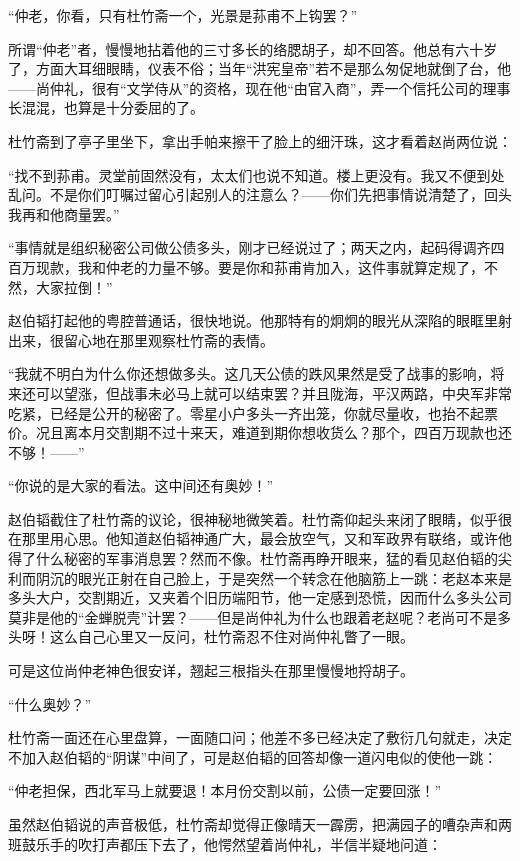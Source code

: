 \par “仲老，你看，只有杜竹斋一个，光景是荪甫不上钩罢？”
\par 所谓“仲老”者，慢慢地拈着他的三寸多长的络腮胡子，却不回答。他总有六十岁了，方面大耳细眼睛，仪表不俗；当年“洪宪皇帝”若不是那么匆促地就倒了台，他——尚仲礼，很有“文学侍从”的资格，现在他“由官入商”，弄一个信托公司的理事长混混，也算是十分委屈的了。
\par 杜竹斋到了亭子里坐下，拿出手帕来擦干了脸上的细汗珠，这才看着赵尚两位说：
\par “找不到荪甫。灵堂前固然没有，太太们也说不知道。楼上更没有。我又不便到处乱问。不是你们叮嘱过留心引起别人的注意么？——你们先把事情说清楚了，回头我再和他商量罢。”
\par “事情就是组织秘密公司做公债多头，刚才已经说过了；两天之内，起码得调齐四百万现款，我和仲老的力量不够。要是你和荪甫肯加入，这件事就算定规了，不然，大家拉倒！”
\par 赵伯韬打起他的粤腔普通话，很快地说。他那特有的炯炯的眼光从深陷的眼眶里射出来，很留心地在那里观察杜竹斋的表情。
\par “我就不明白为什么你还想做多头。这几天公债的跌风果然是受了战事的影响，将来还可以望涨，但战事未必马上就可以结束罢？并且陇海，平汉两路，中央军非常吃紧，已经是公开的秘密了。零星小户多头一齐出笼，你就尽量收，也抬不起票价。况且离本月交割期不过十来天，难道到期你想收货么？那个，四百万现款也还不够！——”
\par “你说的是大家的看法。这中间还有奥妙！”
\par 赵伯韬截住了杜竹斋的议论，很神秘地微笑着。杜竹斋仰起头来闭了眼睛，似乎很在那里用心思。他知道赵伯韬神通广大，最会放空气，又和军政界有联络，或许他得了什么秘密的军事消息罢？然而不像。杜竹斋再睁开眼来，猛的看见赵伯韬的尖利而阴沉的眼光正射在自己脸上，于是突然一个转念在他脑筋上一跳：老赵本来是多头大户，交割期近，又夹着个旧历端阳节，他一定感到恐慌，因而什么多头公司莫非是他的“金蝉脱壳”计罢？——但是尚仲礼为什么也跟着老赵呢？老尚可不是多头呀！这么自己心里又一反问，杜竹斋忍不住对尚仲礼瞥了一眼。
\par 可是这位尚仲老神色很安详，翘起三根指头在那里慢慢地捋胡子。
\par “什么奥妙？”
\par 杜竹斋一面还在心里盘算，一面随口问；他差不多已经决定了敷衍几句就走，决定不加入赵伯韬的“阴谋”中间了，可是赵伯韬的回答却像一道闪电似的使他一跳：
\par “仲老担保，西北军马上就要退！本月份交割以前，公债一定要回涨！”
\par 虽然赵伯韬说的声音极低，杜竹斋却觉得正像晴天一霹雳，把满园子的嘈杂声和两班鼓乐手的吹打声都压下去了，他愕然望着尚仲礼，半信半疑地问道：
